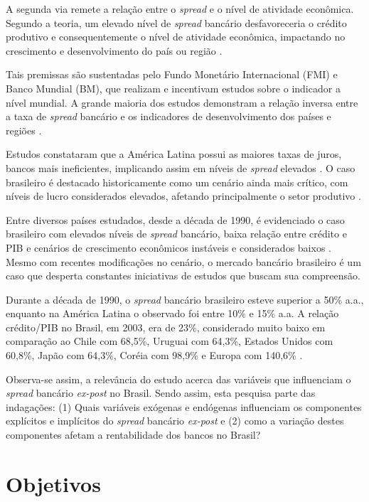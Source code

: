 \documentclass[12pt,12pt,openright,oneside,a4paper,chapter=TITLE,section=TITLE,subsection=TITLE,subsubsection=TITLE,english,french,spanish,portugues,sumario=tradicional]{abntex2}
\begin{document}
A segunda via remete a relação entre o \emph{spread} e o nível de atividade
econômica. Segundo a teoria, um elevado nível de \emph{spread} bancário
desfavoreceria o crédito produtivo e consequentemente o nível de atividade
econômica, impactando no crescimento e desenvolvimento do país ou região \cite{WB:2005} \cite{dantas:2012} \cite{leal:2006}.

Tais premissas são sustentadas pelo Fundo Monetário Internacional (FMI) e Banco Mundial (BM), que realizam e incentivam estudos sobre o indicador a nível mundial. A grande maioria dos estudos demonstram a relação inversa entre a taxa de \emph{spread} bancário e os indicadores de desenvolvimento dos países e regiões \cite{WB:2005}.

Estudos constataram que a América Latina possui as maiores taxas de juros, bancos mais ineficientes, implicando assim em níveis de \emph{spread} elevados \cite{dantas:2012}. O caso brasileiro é destacado historicamente como um cenário ainda mais crítico, com níveis de lucro considerados elevados, afetando principalmente o setor produtivo \cite{dantas:2012}.

Entre diversos países estudados, desde a década de 1990, é evidenciado o caso brasileiro com elevados níveis de \emph{spread} bancário, baixa relação entre crédito e PIB e cenários de crescimento econômicos instáveis e considerados baixos \cite{levine:1997, matos:2003}. Mesmo com recentes modificações no cenário, o mercado bancário brasileiro é um caso que desperta constantes iniciativas de estudos que buscam sua compreensão.

Durante a década de 1990, o \emph{spread} bancário brasileiro esteve superior a 50\% a.a., enquanto na América Latina o observado foi entre 10\% e 15\% a.a. A relação crédito/PIB no Brasil, em 2003, era de 23\%, considerado muito baixo em comparação ao Chile com 68,5\%, Uruguai com 64,3\%, Estados Unidos com 60,8\%, Japão com 64,3\%, Coréia com 98,9\% e Europa com 140,6\% \cite{camargo:2009, singh:2005}.

Observa-se assim, a relevância do estudo acerca das variáveis que influenciam o \emph{spread} bancário \emph{ex-post} no Brasil. Sendo assim, esta pesquisa parte das indagações: (1) Quais variáveis exógenas e endógenas influenciam os componentes explícitos e implícitos do \emph{spread} bancário \emph{ex-post} e (2) como a variação destes componentes afetam a rentabilidade dos bancos no Brasil?

\section{Objetivos}
\end{document}
